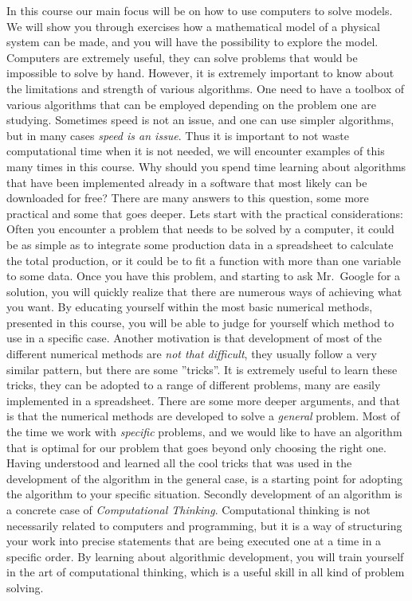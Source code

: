 \documentclass[graybox,sectrefs,envcountresetchap,open=right,final]{svmonodo}
\begin{document}
In this course our main focus will be on how to use computers to solve models. We will show you through exercises how a mathematical model of
a physical system can be made, and you will have the possibility to explore the model. Computers are extremely useful, they can solve problems that
would be impossible to solve by hand. However, it is extremely important to know about the limitations and strength of various algorithms. One need
to have a toolbox of various algorithms that can be employed depending on the problem one are studying. Sometimes speed is not an issue, and one can use
simpler algorithms, but in many cases \emph{speed is an issue}. Thus it is important to not waste computational time when it is not needed, we will encounter 
examples of this many times in this course. Why should you spend time learning about algorithms that have been implemented already in a software that 
most likely can be downloaded for free? There are many answers to this question, some more practical and some that goes deeper. Lets start with the
practical considerations: Often you encounter a problem that needs to be solved by a computer, it could be as simple as to integrate some production data 
in a spreadsheet to calculate the total production, or it could be to fit a function with more than one variable to some data. Once you have this problem, and 
starting to ask Mr.~Google for a solution, you will quickly realize that there are numerous ways of achieving what you want. By educating yourself 
within the most basic numerical methods, presented in this course, you will be able to judge for yourself which method to use in a specific case. 
Another motivation is that development of most of the different numerical methods are \emph{not that difficult}, they usually follow a very similar pattern, but
there are some ''tricks''. It is extremely useful to learn these tricks, they can be adopted to a range of different problems, many are easily implemented
in a spreadsheet. There are some more deeper arguments, and that is that the numerical methods are developed to solve a \emph{general} problem. Most of the 
time we work with \emph{specific} problems, and we would like to have an algorithm that is optimal for our problem that goes beyond only choosing the right one. 
Having understood and learned all the cool tricks that was used in the development of the algorithm in the general case, 
is a starting point for adopting the algorithm to your specific situation. Secondly development of an algorithm is a concrete case of \emph{Computational Thinking}.
Computational thinking is not necessarily related to computers and programming, but it is a way of structuring your work 
into precise statements that are being executed one at a time in a specific order. By learning about algorithmic development, you 
will train yourself in the art of computational thinking, which is a useful skill in all kind of problem solving. 
\end{document}
